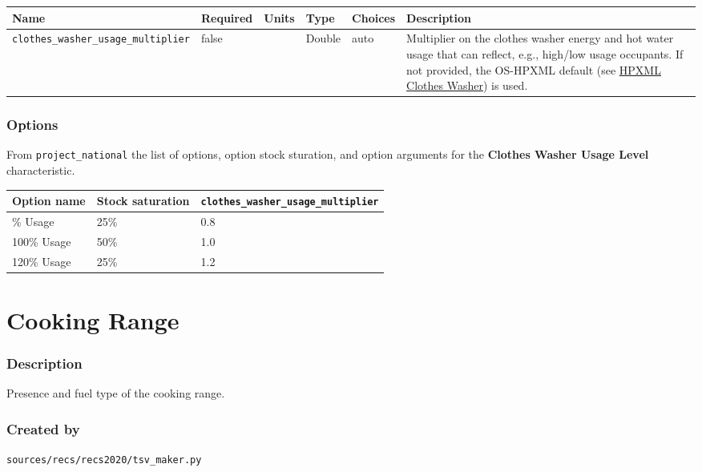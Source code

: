 \begin{longtable}[]{@{}llllll@{}}
\toprule\noalign{}
Name & Required & Units & Type & Choices & Description \\
\midrule\noalign{}
\endhead
\bottomrule\noalign{}
\endlastfoot
\texttt{clothes\_washer\_usage\_multiplier} & false & & Double & auto &
Multiplier on the clothes washer energy and hot water usage that can
reflect, e.g., high/low usage occupants. If not provided, the OS-HPXML
default (see
\href{https://openstudio-hpxml.readthedocs.io/en/v1.7.0/workflow_inputs.html\#hpxml-clothes-washer}{HPXML
Clothes Washer}) is used. \\
\end{longtable}

\subsubsection{Options}\label{options-19}

From \texttt{project\_national} the list of options, option stock
sturation, and option arguments for the \textbf{Clothes Washer Usage
Level} characteristic.

\begin{longtable}[]{@{}lll@{}}
\toprule\noalign{}
Option name & Stock saturation &
\texttt{clothes\_washer\_usage\_multiplier} \\
\midrule\noalign{}
\endhead
\bottomrule\noalign{}
\endlastfoot
80\% Usage & 25\% & 0.8 \\
100\% Usage & 50\% & 1.0 \\
120\% Usage & 25\% & 1.2 \\
\end{longtable}

\section{Cooking Range}\label{cooking_range}

\subsubsection{Description}\label{description-20}

Presence and fuel type of the cooking range.

\subsubsection{Created by}\label{created-by-20}

\texttt{sources/recs/recs2020/tsv\_maker.py}

